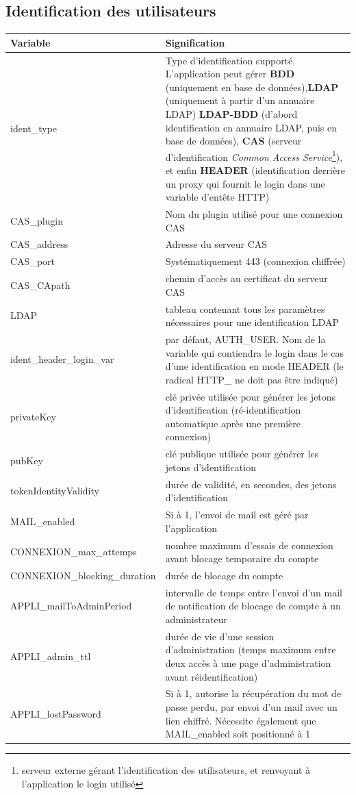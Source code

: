 \subsection{Identification des utilisateurs}

\begin{longtable}{|p{6cm}|p{10cm}|}
\hline
\textbf{Variable} & \textbf{Signification} \\
\hline
\endhead
ident\_type & Type d'identification supporté. L'application peut gérer \textbf{BDD} (uniquement en base de données),\textbf{LDAP} (uniquement à partir d'un annuaire LDAP) \textbf{LDAP-BDD} (d'abord identification en annuaire LDAP, puis en base de données), \textbf{CAS} (serveur d'identification \textit{Common Access Service}\footnote{serveur externe gérant l'identification des utilisateurs, et renvoyant à l'application le login utilisé}), et enfin \textbf{HEADER} (identification derrière un proxy qui fournit le login dans une variable d'entête HTTP)\\
\hline
CAS\_plugin & Nom du plugin utilisé pour une connexion CAS \\
\hline
CAS\_address & Adresse du serveur CAS\\
\hline
CAS\_port & Systématiquement 443 (connexion chiffrée)\\
\hline
CAS\_CApath & chemin d'accès au certificat du serveur CAS \\
\hline
LDAP & tableau contenant tous les paramètres nécessaires pour une identification LDAP \\
\hline
ident\_header\_login\_var & par défaut, AUTH\_USER. Nom de la variable qui contiendra le login dans le cas d'une identification en mode HEADER (le radical HTTP\_  ne doit pas être indiqué) \\
\hline
privateKey & clé privée utilisée pour générer les jetons d'identification (ré-identification automatique après une première connexion) \\
\hline
pubKey & clé publique utilisée pour générer les jetons d'identification \\
\hline
tokenIdentityValidity & durée de validité, en secondes, des jetons d'identification\\
\hline
MAIL\_enabled & Si à 1, l'envoi de mail est géré par l'application \\
\hline
CONNEXION\_max\_attemps & nombre maximum d'essais de connexion avant blocage temporaire du compte \\
\hline
CONNEXION\_blocking\_duration & durée de blocage du compte \\
\hline
APPLI\_mailToAdminPeriod & intervalle de temps entre l'envoi d'un mail de notification de blocage de compte à un administrateur \\
\hline
APPLI\_admin\_ttl & durée de vie d'une session d'administration (temps maximum entre deux accès à une page d'administration avant réidentification) \\
\hline
APPLI\_lostPassword & Si à 1, autorise la récupération du mot de passe perdu, par envoi d'un mail avec un lien chiffré. Nécessite également que MAIL\_enabled soit positionné à 1 \\
\hline


\end{longtable}
